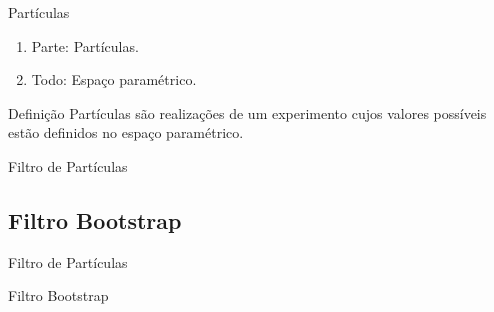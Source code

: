 \documentclass{beamer}
\begin{document}
\begin{frame}{Partículas}
\noindent


    \begin{enumerate}
      \item<2-| alert@2> Parte: Partículas.
      \item<3-| alert@3> Todo: Espaço paramétrico.
    \end{enumerate}
    
\pause
\pause
\pause
  \begin{block}{Definição}
  {\large Partículas são realizações de um experimento cujos valores possíveis estão definidos no espaço paramétrico.}
\end{block}


 
\end{frame}



\begin{frame}{}
    \begin{block}{}
      \Huge  Filtro de Partículas
    \end{block}
\end{frame}

\subsection{Filtro Bootstrap}

\begin{frame}{Filtro de Partículas}
    \begin{block}{}
      \Huge  Filtro Bootstrap
    \end{block}
\end{frame}
\end{document}
